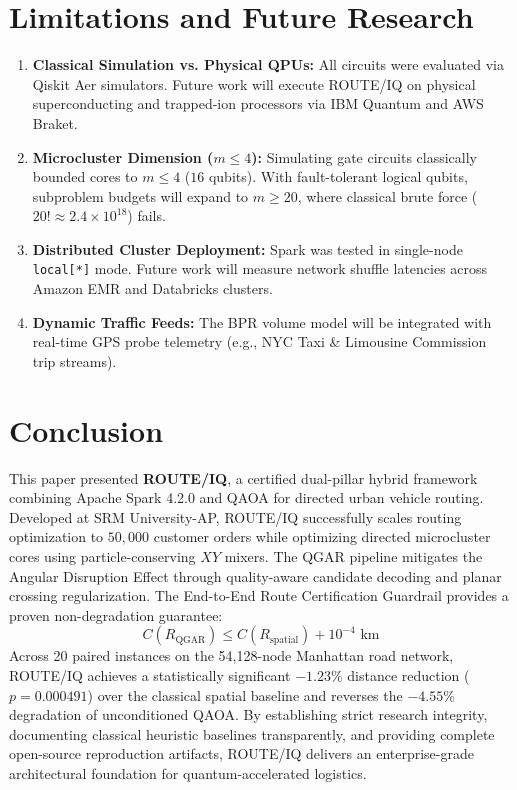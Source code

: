 \documentclass[journal,10pt]{IEEEtran}
\begin{document}
\section{Limitations and Future Research}
\begin{enumerate}
    \item \textbf{Classical Simulation vs. Physical QPUs:} All circuits were evaluated via Qiskit Aer simulators. Future work will execute ROUTE/IQ on physical superconducting and trapped-ion processors via IBM Quantum and AWS Braket.
    \item \textbf{Microcluster Dimension ($m \le 4$):} Simulating gate circuits classically bounded cores to $m \le 4$ ($16$ qubits). With fault-tolerant logical qubits, subproblem budgets will expand to $m \ge 20$, where classical brute force ($20! \approx 2.4 \times 10^{18}$) fails.
    \item \textbf{Distributed Cluster Deployment:} Spark was tested in single-node \texttt{local[*]} mode. Future work will measure network shuffle latencies across Amazon EMR and Databricks clusters.
    \item \textbf{Dynamic Traffic Feeds:} The BPR volume model will be integrated with real-time GPS probe telemetry (e.g., NYC Taxi \& Limousine Commission trip streams).
\end{enumerate}

\section{Conclusion}
This paper presented \textbf{ROUTE/IQ}, a certified dual-pillar hybrid framework combining Apache Spark 4.2.0 and QAOA for directed urban vehicle routing. Developed at SRM University-AP, ROUTE/IQ successfully scales routing optimization to $50,000$ customer orders while optimizing directed microcluster cores using particle-conserving $XY$ mixers. The QGAR pipeline mitigates the Angular Disruption Effect through quality-aware candidate decoding and planar crossing regularization. The End-to-End Route Certification Guardrail provides a proven non-degradation guarantee:
\[
C(R_{\text{QGAR}}) \le C(R_{\text{spatial}}) + 10^{-4}\text{ km}
\]
Across 20 paired instances on the 54,128-node Manhattan road network, ROUTE/IQ achieves a statistically significant $-1.23\%$ distance reduction ($p = 0.000491$) over the classical spatial baseline and reverses the $-4.55\%$ degradation of unconditioned QAOA. By establishing strict research integrity, documenting classical heuristic baselines transparently, and providing complete open-source reproduction artifacts, ROUTE/IQ delivers an enterprise-grade architectural foundation for quantum-accelerated logistics.
\end{document}
